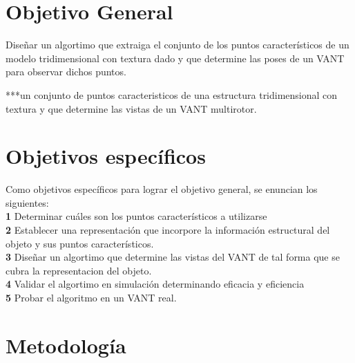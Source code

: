 \documentclass[]{report}
\begin{document}
\section{Objetivo General}
 Diseñar un algortimo que extraiga el conjunto de los puntos característicos de un modelo tridimensional con textura dado y que determine las poses de un VANT para observar dichos puntos.

***un conjunto de puntos caracteristicos de una estructura tridimensional con textura y que determine las vistas de un VANT multirotor.

\section{Objetivos específicos}
Como objetivos específicos para lograr el objetivo general, se enuncian los siguientes:\\
 \textbf {1} Determinar cuáles son los puntos característicos a utilizarse\\
 \textbf {2} Establecer una representación que incorpore la información estructural del objeto y sus puntos característicos.\\
\textbf {3} Diseñar un algortimo que determine las vistas del VANT de tal forma que se cubra la representacion del objeto.\\
\textbf {4} Validar el algortimo en simulación determinando eficacia  y eficiencia\\
\textbf{5} Probar el algoritmo en un VANT real.


\section{Metodología}
\end{document}
